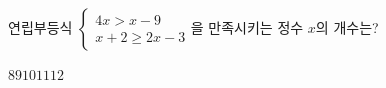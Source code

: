 연립부등식 $\begin{cases} 4x>x-9 \\ x+2\ge 2x-3 \end{cases}$을 만족시키는 정수 $x$의 개수는?
\begin{choices32}{$8$}{$9$}{$10$}{$11$}{$12$}\end{choices32}
